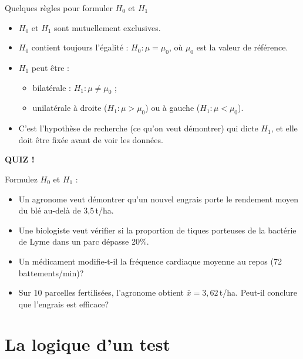 \documentclass{BeamerTemplate}
\begin{document}
\begin{frame}[t]{Quelques règles pour formuler $H_0$ et $H_1$}
  \begin{itemize}\itemsep 4mm
    \item $H_0$ et $H_1$ sont \alert{mutuellement exclusives}.
    \item $H_0$ contient toujours l'\alert{égalité} : $H_0 : \mu = \mu_0$, où $\mu_0$ est la valeur de référence.
    \item<2-> $H_1$ peut être :
      \begin{itemize}
        \item \alert{bilatérale} : $H_1 : \mu \ne \mu_0$ ;
        \item \alert{unilatérale} à droite ($H_1 : \mu > \mu_0$) ou à gauche ($H_1 : \mu < \mu_0$).
      \end{itemize}
    \item<3-> C'est l'\alert{hypothèse de recherche} (ce qu'on veut démontrer) qui dicte $H_1$, et elle doit être fixée \alert{avant} de voir les données.
  \end{itemize}
\end{frame}

\begin{frame}[plain,t]
  \centerline{\LARGE\bfseries\alert{QUIZ !}}

  \medskip
  Formulez $H_0$ et $H_1$ :
  \begin{itemize}\itemsep 0.9cm
    \item Un agronome veut démontrer qu'un nouvel engrais porte le rendement moyen du blé \alert{au-delà} de 3,5\,t/ha.
    \item<2-> Une biologiste veut vérifier si la proportion de tiques porteuses de la bactérie de Lyme dans un parc \alert{dépasse} 20\%.
    \item<3-> Un médicament \alert{modifie}-t-il la fréquence cardiaque moyenne au repos (72 battements/min)?
    \item<4-> Sur 10 parcelles fertilisées, l'agronome obtient $\bar{x} = 3{,}62$\,t/ha. Peut-il conclure que l'engrais est efficace?
  \end{itemize}
\end{frame}

\section{La logique d'un test}
\end{document}

